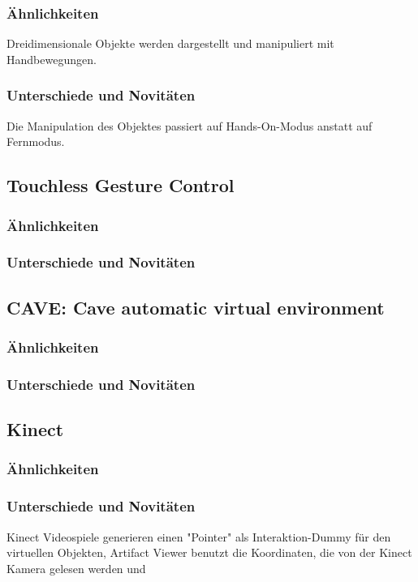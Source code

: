 \documentclass[12pt]{extarticle}
\begin{document}
\subsubsection{Ähnlichkeiten}
Dreidimensionale Objekte werden dargestellt und manipuliert mit Handbewegungen.
\subsubsection{Unterschiede und Novitäten}
Die Manipulation des Objektes passiert auf Hands-On-Modus anstatt auf Fernmodus.
\subsection{Touchless Gesture Control}
\subsubsection{Ähnlichkeiten}
\subsubsection{Unterschiede und Novitäten}
\subsection{CAVE: Cave automatic virtual environment}
\subsubsection{Ähnlichkeiten}
\subsubsection{Unterschiede und Novitäten}
\subsection{Kinect}
\subsubsection{Ähnlichkeiten}

\subsubsection{Unterschiede und Novitäten}
Kinect Videospiele generieren einen "Pointer" als Interaktion-Dummy für den virtuellen Objekten, Artifact Viewer benutzt die Koordinaten, die von der Kinect Kamera gelesen werden und 

\newpage
\end{document}
